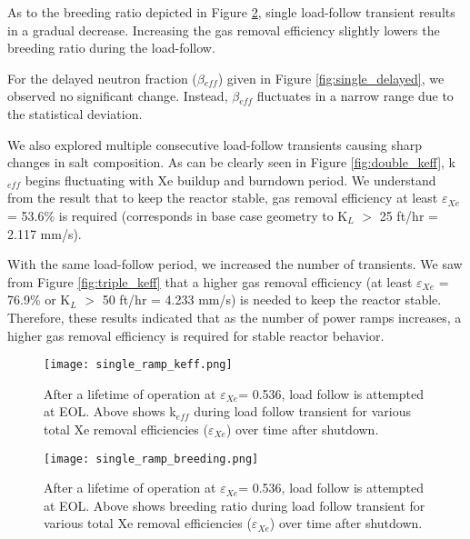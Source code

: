     As to the breeding ratio depicted in Figure \ref{fig:single_breed}, single 
    load-follow transient results in a gradual decrease. Increasing the gas 
    removal efficiency slightly lowers the breeding ratio during the 
    load-follow.

    For the delayed neutron fraction ($\beta$$_{eff}$) given in Figure 
    \ref{fig:single_delayed}, we observed no significant change. Instead, 
    $\beta$$_{eff}$ fluctuates in a narrow range due to the statistical 
    deviation.

    We also explored multiple consecutive load-follow transients causing sharp 
    changes in salt composition. As can be clearly seen in Figure 
    \ref{fig:double_keff}, k$_{eff}$ begins fluctuating with Xe buildup and 
    burndown period. We understand from the result that to keep the reactor 
    stable, gas removal efficiency at least $\varepsilon$$_{Xe}$ = 53.6\% is 
    required (corresponds in base case geometry to K$_{L}$ $>$ 25 ft/hr = 2.117 
    mm/s).

    With the same load-follow period, we increased the number of transients. We 
    saw from Figure \ref{fig:triple_keff} that a higher gas removal efficiency 
    (at least $\varepsilon$$_{Xe}$ = 76.9\% or K$_{L}$ $>$ 50 ft/hr = 4.233 
    mm/s) is needed to keep the reactor stable. Therefore, these results 
    indicated that as the number of power ramps increases, a higher gas removal 
    efficiency is required for stable reactor behavior.

    \begin{figure}[htbp!]
        \begin{center}
            \texttt{[image: single\_ramp\_keff.png]}
        \end{center}
        \caption{After a lifetime of operation at $\varepsilon$$_{Xe}$= 0.536, 
            load follow is attempted at EOL. Above shows k$_{eff}$ during load 
            follow transient for various total Xe removal efficiencies
        ($\varepsilon$$_{Xe}$) over time after shutdown.}
        \label{fig:single_keff}
    \end{figure}

    \begin{figure}[htbp!]
        \begin{center}
            \texttt{[image: single\_ramp\_breeding.png]}
        \end{center}
        \caption{After a lifetime of operation at $\varepsilon$$_{Xe}$= 0.536, 
            load follow is attempted at EOL. Above shows breeding ratio during 
            load
        follow transient for various total Xe removal efficiencies
        ($\varepsilon$$_{Xe}$) over time after shutdown.}
        \label{fig:single_breed}
    \end{figure}

